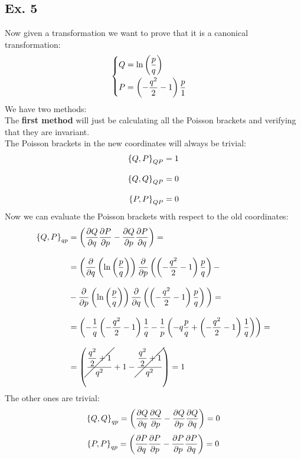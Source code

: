 \subsection{Ex. 5}
Now given a transformation we want to prove that it is a canonical transformation:
\begin{equation}
    \begin{cases}
        Q = \ln \left(\dfrac{p}{q}\right)\\[8pt]
        P = \left(-\dfrac{q^2}{2}-1\right)\dfrac{p}{1}
    \end{cases}
\end{equation}
We have two methods:\\
The \textbf{first method} will just be calculating all the Poisson brackets and verifying that they are invariant.\\
The Poisson brackets in the new coordinates will always be trivial:
\begin{equation}
    \begin{split}
        \pb{Q}{P}_{QP} &= 1\\[8pt]
        \pb{Q}{Q}_{QP} &= 0\\[8pt]
        \pb{P}{P}_{QP} &= 0
    \end{split}
\end{equation}
Now we can evaluate the Poisson brackets with respect to the old coordinates:
\begin{equation}
    \begin{split}
        \pb{Q}{P}_{qp} &= \left(\pdv{Q}{q} \pdv{P}{p} - \pdv{Q}{p} \pdv{P}{q} \right) = \\[8pt]
        &= \bbrackets{\pdv{}{q}\left(\ln\brackets{\dfrac{p}{q}}\right) \pdv{}{p}\left(\brackets{-\dfrac{q^2}{2}-1}\dfrac{p}{q}\right) -\\[8pt]
        &- \pdv{}{p}\left(\ln\brackets{\dfrac{p}{q}}\right) \pdv{}{q}\left(\brackets{-\dfrac{q^2}{2}-1}\dfrac{p}{q}\right) } = \\[8pt]
        &= \left(-\dfrac{1}{q}  \brackets{-\dfrac{q^2}{2}-1}  \dfrac{1}{q} - \dfrac{1}{p}  \brackets{-q  \dfrac{p}{q} + \brackets{-\dfrac{q^2}{2}-1}  \dfrac{1}{q}} \right) = \\[8pt]
        &= \left(\cancel{\dfrac{\dfrac{q^2}{2} + 1}{q^2}} + 1 - \cancel{\dfrac{\dfrac{q^2}{2} + 1}{q^2}} \right) = 1
    \end{split}
\end{equation}
The other ones are trivial:
\begin{equation}
    \pb{Q}{Q}_{qp} = \left(\pdv{Q}{q} \pdv{Q}{p} - \pdv{Q}{p} \pdv{Q}{q} \right) = 0
\end{equation}
\begin{equation}
    \pb{P}{P}_{qp} = \left(\pdv{P}{q} \pdv{P}{p} - \pdv{P}{p} \pdv{P}{q} \right) = 0
\end{equation}

